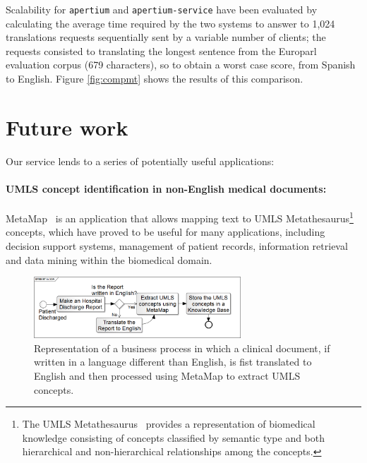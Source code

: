 \documentclass[11pt]{article}
\begin{document}
Scalability for {\tt\small apertium} and {\tt\small apertium-service} have been evaluated by calculating the average time required by the two systems to answer to 1,024 translations requests sequentially sent by a variable number of clients; the requests consisted to translating the longest sentence from the Europarl evaluation corpus (679 characters), so to obtain a worst case score, from Spanish to English. Figure \ref{fig:compmt} shows the results of this comparison.



\section{Future work}


Our service lends to a series of potentially useful applications:

\paragraph{UMLS concept identification in non-English medical documents:} MetaMap~\citep{metamap} is an application that allows mapping text to UMLS Metathesaurus\footnote{The UMLS Metathesaurus~\citep{umls} provides a representation of biomedical knowledge consisting of concepts classified by semantic type and both hierarchical and non-hierarchical relationships among the concepts.} concepts, which have proved to be useful for many applications, including decision support systems, management of patient records, information retrieval and data mining within the biomedical domain.

\begin{figure}[!ht]
\begin{center}
\includegraphics[width=7.75cm]{mtsoa}
\end{center}
\caption{Representation of a business process in which a clinical document, if written in a language different than English, is fist translated to English and then processed using MetaMap to extract UMLS concepts.}
\label{fig:mtsoa}
\end{figure}
\end{document}

